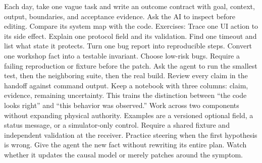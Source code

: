 {}Each day, take one vague task and write an outcome contract with goal, context,\markdownRendererSoftLineBreak
{}output, boundaries, and acceptance evidence. Ask the AI to inspect before\markdownRendererSoftLineBreak
{}editing. Compare its system map with the code.\markdownRendererParagraphSeparator
{}Exercises:\markdownRendererInterblockSeparator
{}\markdownRendererOlBegin
{}Trace one UI action to its side effect.\markdownRendererOlItemEnd 
{}Explain one protocol field and its validation.\markdownRendererOlItemEnd 
{}Find one timeout and list what state it protects.\markdownRendererOlItemEnd 
{}Turn one bug report into reproducible steps.\markdownRendererOlItemEnd 
{}Convert one workshop fact into a testable invariant.\markdownRendererOlItemEnd 
\markdownRendererOlEnd \markdownRendererInterblockSeparator
{}
\markdownRendererSectionEnd \markdownRendererSectionBegin
{}\markdownRendererInterblockSeparator
{}Choose low-risk bugs. Require a failing reproduction or fixture before the\markdownRendererSoftLineBreak
{}patch. Ask the agent to run the smallest test, then the neighboring suite, then\markdownRendererSoftLineBreak
{}the real build. Review every claim in the handoff against command output.\markdownRendererParagraphSeparator
{}Keep a notebook with three columns: claim, evidence, remaining uncertainty.\markdownRendererSoftLineBreak
{}This trains the distinction between “the code looks right” and “this behavior\markdownRendererSoftLineBreak
{}was observed.”\markdownRendererInterblockSeparator
{}
\markdownRendererSectionEnd \markdownRendererSectionBegin
{}\markdownRendererInterblockSeparator
{}Work across two components without expanding physical authority. Examples are\markdownRendererSoftLineBreak
{}a versioned optional field, a status message, or a simulator-only control.\markdownRendererSoftLineBreak
{}Require a shared fixture and independent validation at the receiver.\markdownRendererParagraphSeparator
{}Practice steering when the first hypothesis is wrong. Give the agent the new\markdownRendererSoftLineBreak
{}fact without rewriting its entire plan. Watch whether it updates the causal\markdownRendererSoftLineBreak
{}model or merely patches around the symptom.\markdownRendererInterblockSeparator
{}
\markdownRendererSectionEnd \markdownRendererSectionBegin
{}\markdownRendererInterblockSeparator
